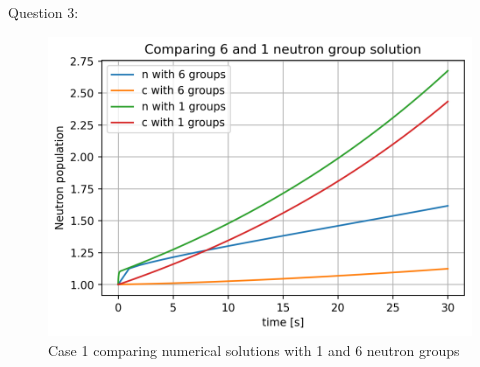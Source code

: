 \documentclass[12pt,fleqn, parskip=full]{scrartcl}
\begin{document}
Question 3:
\begin{figure}[H]
	\centering
	\includegraphics[scale=1]{Image_17_hw_4}
	\caption{Case 1 comparing numerical solutions with 1 and 6 neutron groups}
\end{figure}
\end{document}
